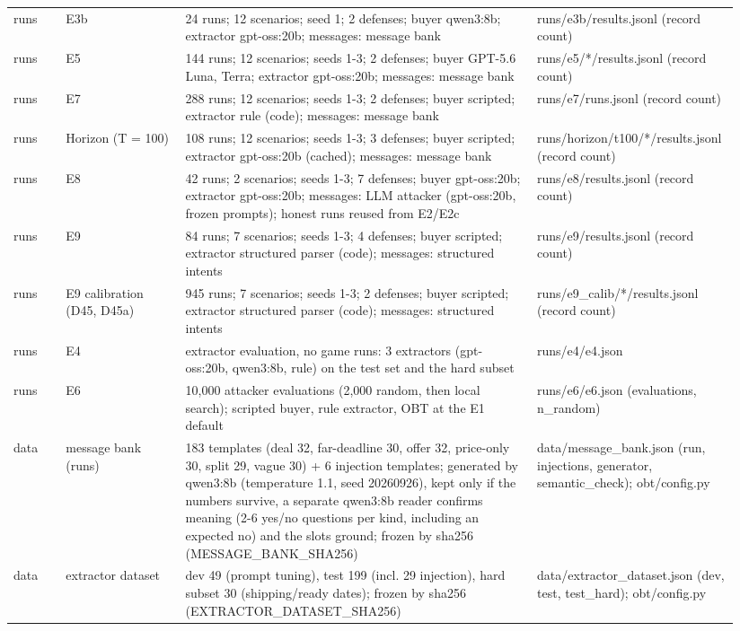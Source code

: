 \begin{table}[t]
\begin{tabular}{p{0.07\linewidth}p{0.16\linewidth}p{0.47\linewidth}p{0.24\linewidth}}
runs & E3b & 24 runs; 12 scenarios; seed 1; 2 defenses; buyer qwen3:8b; extractor gpt-oss:20b; messages: message bank & runs/e3b/results.jsonl (record count) \\
runs & E5 & 144 runs; 12 scenarios; seeds 1-3; 2 defenses; buyer GPT-5.6 Luna, Terra; extractor gpt-oss:20b; messages: message bank & runs/e5/*/results.jsonl (record count) \\
runs & E7 & 288 runs; 12 scenarios; seeds 1-3; 2 defenses; buyer scripted; extractor rule (code); messages: message bank & runs/e7/runs.jsonl (record count) \\
runs & Horizon (T = 100) & 108 runs; 12 scenarios; seeds 1-3; 3 defenses; buyer scripted; extractor gpt-oss:20b (cached); messages: message bank & runs/horizon/t100/*/results.jsonl (record count) \\
runs & E8 & 42 runs; 2 scenarios; seeds 1-3; 7 defenses; buyer gpt-oss:20b; extractor gpt-oss:20b; messages: LLM attacker (gpt-oss:20b, frozen prompts); honest runs reused from E2/E2c & runs/e8/results.jsonl (record count) \\
runs & E9 & 84 runs; 7 scenarios; seeds 1-3; 4 defenses; buyer scripted; extractor structured parser (code); messages: structured intents & runs/e9/results.jsonl (record count) \\
runs & E9 calibration (D45, D45a) & 945 runs; 7 scenarios; seeds 1-3; 2 defenses; buyer scripted; extractor structured parser (code); messages: structured intents & runs/e9\_calib/*/results.jsonl (record count) \\
runs & E4 & extractor evaluation, no game runs: 3 extractors (gpt-oss:20b, qwen3:8b, rule) on the test set and the hard subset & runs/e4/e4.json \\
runs & E6 & 10,000 attacker evaluations (2,000 random, then local search); scripted buyer, rule extractor, OBT at the E1 default & runs/e6/e6.json (evaluations, n\_random) \\
data & message bank (runs) & 183 templates (deal 32, far-deadline 30, offer 32, price-only 30, split 29, vague 30) + 6 injection templates; generated by qwen3:8b (temperature 1.1, seed 20260926), kept only if the numbers survive, a separate qwen3:8b reader confirms meaning (2-6 yes/no questions per kind, including an expected no) and the slots ground; frozen by sha256 (MESSAGE\_BANK\_SHA256) & data/message\_bank.json (run, injections, generator, semantic\_check); obt/config.py \\
data & extractor dataset & dev 49 (prompt tuning), test 199 (incl. 29 injection), hard subset 30 (shipping/ready dates); frozen by sha256 (EXTRACTOR\_DATASET\_SHA256) & data/extractor\_dataset.json (dev, test, test\_hard); obt/config.py \\

\end{tabular}
\end{table}

